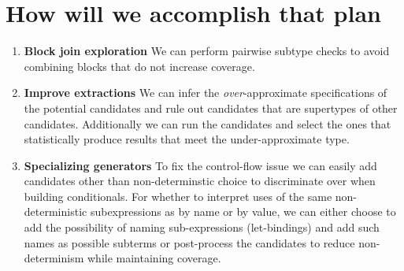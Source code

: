 \documentclass[review, sigplan]{acmart}
\begin{document}
\section*{How will we accomplish that plan}


\begin{enumerate}
\item \textbf{Block join exploration}
    We can perform pairwise subtype checks to avoid
    combining blocks that do not increase coverage.

\item \textbf{Improve extractions}
    We can infer the \emph{over}-approximate
    specifications of the potential candidates and rule
    out candidates that are supertypes of other candidates.
    Additionally we can run the candidates and select the
    ones that statistically produce results that
    meet the under-approximate type.

\item \textbf{Specializing generators}
    To fix the control-flow issue we can easily add candidates
    other than non-determinstic choice to discriminate
    over when building conditionals.
    For whether to interpret uses of the same non-deterministic
    subexpressions as by name or by value,
    we can either choose to add the possibility
    of naming sub-expressions (let-bindings) and add
    such names as possible subterms or post-process
    the candidates to reduce non-determinism while maintaining
    coverage.
\end{enumerate}


% 
\end{document}
